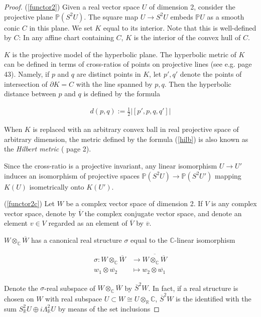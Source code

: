 \documentclass[11pt]{article}
\numberwithin{equation}{section}
\theoremstyle{plain}
\theoremstyle{remark}
\renewcommand{\L}{\Lambda}
\newcommand{\R}{\mathbb{R}}
\newcommand{\C}{\mathbb{C}}
\begin{document}
\begin{proof}

(\ref{functor2}) Given a real vector space $U$ of dimension 2, consider the projective plane $\mathbb{P}(S^{2}U)$. The square map $U\rightarrow  S^{2}U$ embeds $\mathbb{P}U$ as a smooth conic $C$ in this plane. We set $K$ equal to its interior. Note that this is well-defined by $C$: In any affine chart containing $C$, $K$ is the interior of the convex hull of $C$.

$K$ is the projective model of the hyperbolic plane. The hyperbolic metric of $K$ can be defined in terms of cross-ratios of points on projective lines (see e.g. \cite{billiards} page 43). Namely, if $p$ and $q$ are distinct points in $K$, let $p',q'$ denote the points of intersection of $\partial K = C$ with the line spanned by $p,q$. Then the hyperbolic distance between $p$ and $q$ is defined by the formula

\begin{align}\label{hilb}
d(p,q):=\tfrac{1}{2}\left|[p',p,q,q']\right| 
\end{align}

When $K$ is replaced with an arbitrary convex ball in real projective space of arbitrary dimension, the metric defined by the formula (\ref{hilb}) is also known as the \emph{Hilbert metric} (\cite{guo} page 2).

Since the cross-ratio is a projective invariant, any linear isomorphism $U\rightarrow  U'$ induces an isomorphism of projective spaces $\mathbb{P}(S^{2}U)\rightarrow \mathbb{P}(S^{2}U')$ mapping $K(U)$ isometrically onto $K(U')$.

(\ref{functor2c}) Let $W$ be a complex vector space of dimension 2. If $V$ is any complex vector space, denote by $\overline{V}$ the complex conjugate vector space, and denote an element $v\in V$ regarded as an element of $\overline{V}$ by $\overline{v}$.

$W\otimes_{\C}\overline{W}$ has a canonical real structure $\sigma$ equal to the $\C$-linear isomorphism

\begin{align*}
\sigma: W\otimes_{\C}\overline{W}&\rightarrow \overline{ W\otimes_{\C}\overline{W}}\\
 w_1 \otimes \overline{w_2} &\mapsto w_2\otimes \overline{w_1}
\end{align*}

Denote the $\sigma$-real subspace of $W\otimes_{\C}\overline{W}$ by $\overline{S}^{2}W$. In fact, if a real structure is chosen on $W$ with real subspace $U\subset W\cong U\otimes_{\R}\C$, $\overline{S}^{2}W$ is the identified with the sum $S^{2}_{\R}U\oplus i \L^{2}_{\R}U$ by means of the set inclusions


\end{proof}
\end{document}
